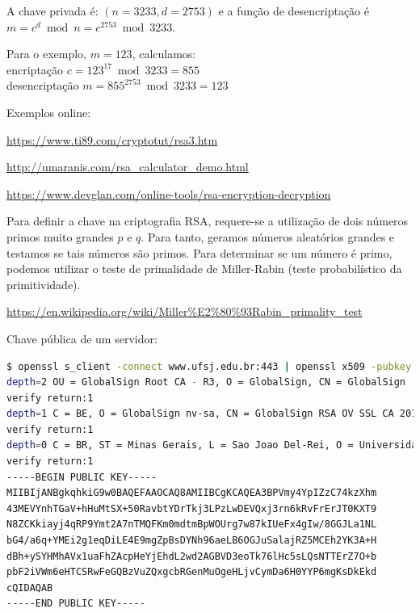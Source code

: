 \begin{frame}
A chave privada é: $(n=3233, d=2753)$ e a função de desencriptação é $m = c^d \bmod{n} = c^{2753} \bmod 3233$.

\vspace{2ex}
Para o exemplo, $m=123$, calculamos:\\
encriptação $c = 123^{17} \bmod 3233 = 855$\\
desencriptação $m = 855^{2753} \bmod 3233 = 123$

\framebreak

Exemplos online:

\url{https://www.ti89.com/cryptotut/rsa3.htm} 

\url{http://umaranis.com/rsa_calculator_demo.html} 

\url{https://www.devglan.com/online-tools/rsa-encryption-decryption}


\framebreak

Para definir a chave na criptografia RSA, requere-se a utilização de dois números primos muito grandes $p$ e $q$.
Para tanto, geramos números aleatórios grandes e testamos se tais números são primos. Para determinar se um número
é primo, podemos utilizar o teste de primalidade de Miller-Rabin (teste probabilístico da primitividade).

\url{https://en.wikipedia.org/wiki/Miller\%E2\%80\%93Rabin\_primality\_test}

\framebreak

Chave pública de um servidor:
\begin{lstlisting}[language=bash, label=lst-ufsj-key, caption={Visualizando a chave pública da UFSJ (armored ASCII).}, postbreak=\mbox{$\hookrightarrow$\space}, basicstyle=\fontsize{8}{10}\selectfont\ttfamily]
$ openssl s_client -connect www.ufsj.edu.br:443 | openssl x509 -pubkey -noout
depth=2 OU = GlobalSign Root CA - R3, O = GlobalSign, CN = GlobalSign
verify return:1
depth=1 C = BE, O = GlobalSign nv-sa, CN = GlobalSign RSA OV SSL CA 2018
verify return:1
depth=0 C = BR, ST = Minas Gerais, L = Sao Joao Del-Rei, O = Universidade Federal de Sao Joao Del-Rei - UFSJ, CN = ufsj.edu.br
verify return:1
-----BEGIN PUBLIC KEY-----
MIIBIjANBgkqhkiG9w0BAQEFAAOCAQ8AMIIBCgKCAQEA3BPVmy4YpIZzC74kzXhm
43MEVYnhTGaV+hHuMtSX+50RavbtYDrTkj3LPzLwDEVQxj3rn6kRvFrErJT0KXT9
N8ZCKkiayj4qRP9Ymt2A7nTMQFKm0mdtmBpWOUrg7w87kIUeFx4gIw/8GGJLa1NL
bG4/a6q+YMEi2g1eqDiLE4E9mgZpBsDYNh96aeLB6OGJuSalajRZ5MCEh2YK3A+H
dBh+ySYHMhAVx1uaFhZAcpHeYjEhdL2wd2AGBVD3eoTk76lHc5sLQsNTTErZ7O+b
pbF2iVWm6eHTCSRwFeGQBzVuZQxgcbRGenMuOgeHLjvCymDa6H0YYP6mgKsDkEkd
cQIDAQAB
-----END PUBLIC KEY-----
\end{lstlisting}


\end{frame}
